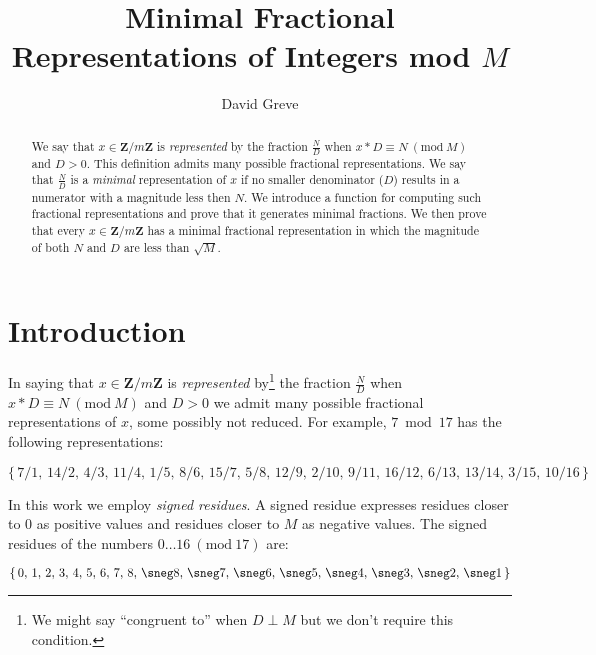 \documentclass[submission,copyright,creativecommons]{eptcs}
\title{Minimal Fractional Representations of Integers mod $M$ }
\author{David Greve
\email{david@thegreves.com}
}
\newcommand{\Mod}[1]{\ (\mathrm{mod}\ #1)}
\begin{document}
\maketitle

\begin{abstract}

We say that $x \in \mathbf{Z}/m\mathbf{Z}$ is \emph{represented} by
the fraction $\frac{N}{D}$ when $x*D \equiv N \Mod{M}$ and $D > 0$.
This definition admits many possible fractional representations.  We
say that $\frac{N}{D}$ is a \emph{minimal} representation of $x$ if no
smaller denominator ($D$) results in a numerator with a magnitude less
then $N$.  We introduce a function for computing such fractional
representations and prove that it generates minimal fractions.  We
then prove that every $x \in \mathbf{Z}/m\mathbf{Z}$ has a minimal
fractional representation in which the magnitude of both $N$ and $D$
are less than $\sqrt{M}$.

\end{abstract}

\section{Introduction}

In saying that $x \in \mathbf{Z}/m\mathbf{Z}$ is \emph{represented}
by\footnote{ We might say ``congruent to'' when $D \perp M$ but we don't
require this condition.  }  the fraction $\frac{N}{D}$ when $x*D \equiv N
\Mod{M}$ and $D > 0$ we admit many possible fractional representations
of $x$, some possibly not reduced.  For example, $7 \bmod 17$ has the
following representations:

\[
\{
\,7/1,\, 14/2,\, 4/3,\, 11/4,\, 1/5,\, 8/6,\, 15/7,\, 5/8,\, 12/9 ,\, 2/10,\, 9/11,\, 16/12 ,\,6/13,\, 13/14,\, 3/15,\, 10/16 \,
\}
\]

In this work we employ \emph{signed residues}.  A signed
residue expresses residues closer to 0 as positive values and
residues closer to $M$ as negative values.  
The signed residues of the numbers $0\dots16 \Mod{17}$ are:

\[
\{
\,0,\,1,\,2,\,3,\,4,\,5,\,6,\,7,\,8,\,\sneg8,\,\sneg7,\,\sneg6,\,\sneg5,\,\sneg4,\,\sneg3,\,\sneg2,\,\sneg1\,
\}
\]
\end{document}
